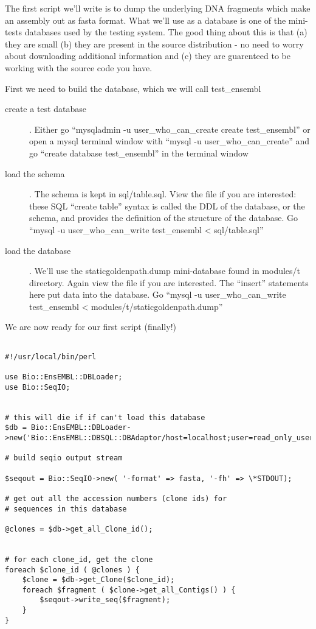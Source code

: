 \documentclass[11pt,a4paper]{article}
\begin{document}
The first script we'll write is to dump the underlying DNA fragments which make an assembly out
as fasta format. What we'll use as a database is one of the mini-tests databases used by the testing
system. The good thing about this is that (a) they are small (b) they are present in the source
distribution - no need to worry about downloading additional information and (c) they are guarenteed
to be working with the source code you have.

First we need to build the database, which we will call test\_ensembl

\begin{description}
\item[create a test database]. Either go ``mysqladmin -u user\_who\_can\_create create test\_ensembl'' or open
a mysql terminal window with ``mysql -u user\_who\_can\_create'' and go ``create database test\_ensembl''
in the terminal window
\item[load the schema]. The schema is kept in sql/table.sql. View the file if you are interested:
these SQL ``create table'' syntax is called the DDL of the database, or the schema, and provides the 
definition of the structure of the database. Go ``mysql -u user\_who\_can\_write test\_ensembl < sql/table.sql''
\item[load the database]. We'll use the staticgoldenpath.dump mini-database found in modules/t directory.
Again view the file if you are interested. The ``insert'' statements here put data into the database. Go
``mysql -u user\_who\_can\_write test\_ensembl < modules/t/staticgoldenpath.dump''
\end{description}

We are now ready for our first script (finally!)

\begin{verbatim}

#!/usr/local/bin/perl

use Bio::EnsEMBL::DBLoader;
use Bio::SeqIO;


# this will die if if can't load this database
$db = Bio::EnsEMBL::DBLoader->new('Bio::EnsEMBL::DBSQL::DBAdaptor/host=localhost;user=read_only_user;dbname=test_ensembl');

# build seqio output stream

$seqout = Bio::SeqIO->new( '-format' => fasta, '-fh' => \*STDOUT);

# get out all the accession numbers (clone ids) for
# sequences in this database

@clones = $db->get_all_Clone_id();


# for each clone_id, get the clone
foreach $clone_id ( @clones ) {
	$clone = $db->get_Clone($clone_id);
	foreach $fragment ( $clone->get_all_Contigs() ) {
		$seqout->write_seq($fragment);
   	}
}

\end{verbatim}
\end{document}
